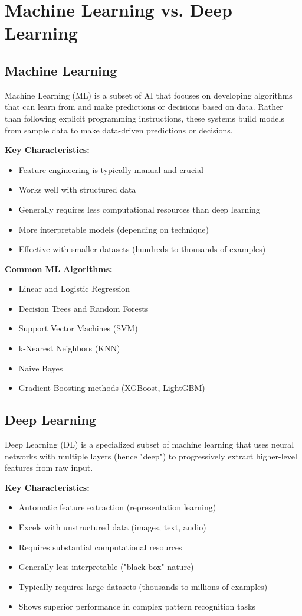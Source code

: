 \documentclass[11pt,a4paper]{report}
\begin{document}
\section{Machine Learning vs. Deep Learning}

\subsection{Machine Learning}
Machine Learning (ML) is a subset of AI that focuses on developing algorithms that can learn from and make predictions or decisions based on data. Rather than following explicit programming instructions, these systems build models from sample data to make data-driven predictions or decisions.

\textbf{Key Characteristics:}
\begin{itemize}
    \item Feature engineering is typically manual and crucial
    \item Works well with structured data
    \item Generally requires less computational resources than deep learning
    \item More interpretable models (depending on technique)
    \item Effective with smaller datasets (hundreds to thousands of examples)
\end{itemize}

\textbf{Common ML Algorithms:}
\begin{itemize}
    \item Linear and Logistic Regression
    \item Decision Trees and Random Forests
    \item Support Vector Machines (SVM)
    \item k-Nearest Neighbors (KNN)
    \item Naive Bayes
    \item Gradient Boosting methods (XGBoost, LightGBM)
\end{itemize}

\subsection{Deep Learning}
Deep Learning (DL) is a specialized subset of machine learning that uses neural networks with multiple layers (hence "deep") to progressively extract higher-level features from raw input.

\textbf{Key Characteristics:}
\begin{itemize}
    \item Automatic feature extraction (representation learning)
    \item Excels with unstructured data (images, text, audio)
    \item Requires substantial computational resources
    \item Generally less interpretable ("black box" nature)
    \item Typically requires large datasets (thousands to millions of examples)
    \item Shows superior performance in complex pattern recognition tasks
\end{itemize}
\end{document}
